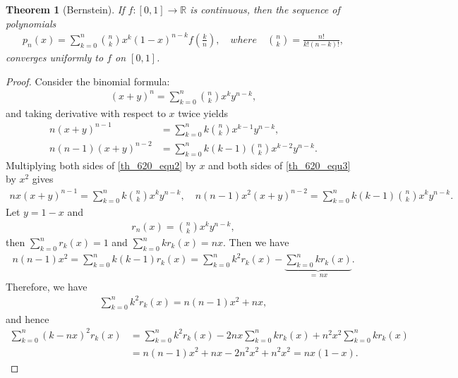 \documentclass[10pt]{book}
\newtheorem{theorem}{Theorem}[chapter]
\theoremstyle{definition}
\numberwithin{equation}{chapter}
\begin{document}
\begin{theorem}[Bernstein]\label{th_620}
If $f: [0,1] \to \mathbb{R}$ is continuous, then the sequence of polynomials
\begin{align*}
    p_n(x) = \sum^n_{k=0} \binom{n}{k} x^k (1 - x)^{n-k} f \left(\frac{k}{n}\right), \quad where \quad \binom{n}{k} = \frac{n!}{k!(n-k)!},
\end{align*}
converges uniformly to $f$ on $[0,1]$.
\end{theorem}
\begin{proof}
Consider the binomial formula:
\begin{align}\label{th_620_equ1}
    (x + y)^n = \sum^n_{k=0} \binom{n}{k} x^k y^{n-k},
\end{align}
and taking derivative with respect to $x$ twice yields
\begin{align}
    n(x + y)^{n-1} & = \sum^n_{k=0} k\binom{n}{k} x^{k-1} y^{n-k}, \label{th_620_equ2}\\
    n(n - 1)(x + y)^{n-2} & = \sum^n_{k=0} k(k - 1)\binom{n}{k} x^{k-2} y^{n-k}. \label{th_620_equ3}
\end{align}
Multiplying both sides of \eqref{th_620_equ2} by $x$ and both sides of \eqref{th_620_equ3} by $x^2$ gives
\begin{align*}
    nx(x + y)^{n-1} = \sum^n_{k=0} k\binom{n}{k} x^{k} y^{n-k}, \quad n(n - 1)x^2(x + y)^{n-2} = \sum^n_{k=0} k(k - 1)\binom{n}{k} x^{k} y^{n-k}.
\end{align*}
Let $y = 1 - x$  and
\begin{align*}
    r_n(x) = \binom{n}{k} x^k y^{n-k},
\end{align*}
then $\sum^n_{k=0} r_k(x) = 1$ and $\sum^n_{k=0} k r_k(x) = nx$. Then we have
\begin{align*}
    n(n - 1)x^2 = \sum^n_{k=0} k(k - 1) r_k(x) = \sum^n_{k=0} k^2 r_k(x) - \underbrace{\sum^n_{k=0} k r_k(x)}_{= \, nx}.
\end{align*}
Therefore, we have
\begin{align*}
    \sum^n_{k=0} k^2 r_k(x) = n(n - 1)x^2 + nx,
\end{align*}
and hence
\begin{align*}
    \sum^n_{k=0} (k - nx)^2 r_k(x) & = \sum^n_{k=0} k^2 r_k(x) - 2nx \sum^n_{k=0} k r_k(x) + n^2x^2 \sum^n_{k=0} k r_k(x) \\
    & = n(n - 1)x^2 + nx - 2n^2 x^2 + n^2 x^2 = nx(1 - x).
\end{align*}


\end{proof}
\end{document}

